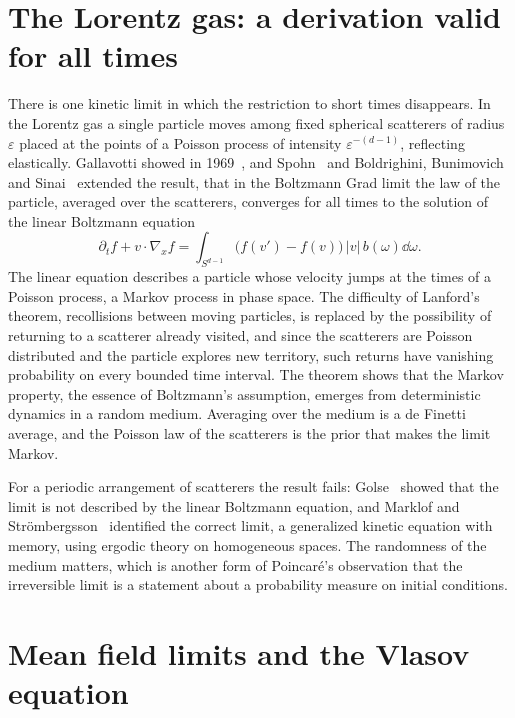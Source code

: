 \section{The Lorentz gas: a derivation valid for all times}

There is one kinetic limit in which the restriction to short times disappears. In the Lorentz gas a single particle moves among fixed spherical scatterers of radius $\varepsilon$ placed at the points of a Poisson process of intensity $\varepsilon^{-(d-1)}$, reflecting elastically. Gallavotti showed in 1969~\cite{gallavotti1969}, and Spohn~\cite{spohn1978} and Boldrighini, Bunimovich and Sinai~\cite{bbs1983} extended the result, that in the Boltzmann Grad limit the law of the particle, averaged over the scatterers, converges for all times to the solution of the linear Boltzmann equation
\[
\partial_tf+v\cdot\nabla_xf = \int_{S^{d-1}}\big(f(v')-f(v)\big)\,|v|\,b(\omega)\dd\omega.
\]
The linear equation describes a particle whose velocity jumps at the times of a Poisson process, a Markov process in phase space. The difficulty of Lanford's theorem, recollisions between moving particles, is replaced by the possibility of returning to a scatterer already visited, and since the scatterers are Poisson distributed and the particle explores new territory, such returns have vanishing probability on every bounded time interval. The theorem shows that the Markov property, the essence of Boltzmann's assumption, emerges from deterministic dynamics in a random medium. Averaging over the medium is a de Finetti average, and the Poisson law of the scatterers is the prior that makes the limit Markov.

For a periodic arrangement of scatterers the result fails: Golse~\cite{golse2008} showed that the limit is not described by the linear Boltzmann equation, and Marklof and Str\"ombergsson~\cite{marklof2011} identified the correct limit, a generalized kinetic equation with memory, using ergodic theory on homogeneous spaces. The randomness of the medium matters, which is another form of Poincar\'e's observation that the irreversible limit is a statement about a probability measure on initial conditions.

\section{Mean field limits and the Vlasov equation}

